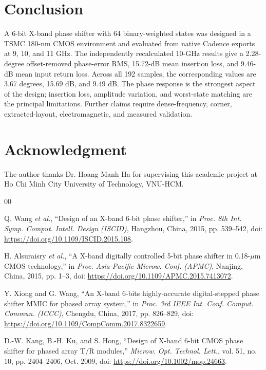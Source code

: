 \documentclass[conference]{IEEEtran}
\begin{document}
\section{Conclusion}

\balance

A 6-bit X-band phase shifter with 64 binary-weighted states was designed in a
TSMC 180-nm CMOS environment and evaluated from native Cadence exports at
9, 10, and 11 GHz. The independently recalculated 10-GHz results give a
2.28-degree offset-removed phase-error RMS, 15.72-dB mean insertion loss, and
9.46-dB mean input return loss.
Across all 192 samples, the corresponding
values are 3.67 degrees, 15.69 dB, and 9.49 dB. The phase response is the
strongest aspect of the design; insertion loss, amplitude variation, and
worst-state matching are the principal limitations. Further claims require
dense-frequency, corner, extracted-layout, electromagnetic, and measured
validation.

\section*{Acknowledgment}

The author thanks Dr. Hoang Manh Ha for supervising this academic project at
Ho Chi Minh City University of Technology, VNU-HCM.

\begin{thebibliography}{00}

Q. Wang \textit{et al.}, ``Design of an X-band 6-bit phase shifter,'' in
\textit{Proc. 8th Int. Symp. Comput. Intell. Design (ISCID)}, Hangzhou,
China, 2015, pp. 539--542, doi:
\url{https://doi.org/10.1109/ISCID.2015.108}.

H. Alsuraisry \textit{et al.}, ``A X-band digitally controlled 5-bit phase
shifter in 0.18-$\mu$m CMOS technology,'' in \textit{Proc. Asia-Pacific
Microw. Conf. (APMC)}, Nanjing, China, 2015, pp. 1--3,
doi: \url{https://doi.org/10.1109/APMC.2015.7413072}.

Y. Xiong and G. Wang, ``An X-band 6-bits highly-accurate digital-stepped
phase shifter MMIC for phased array system,'' in \textit{Proc. 3rd IEEE Int.
Conf. Comput. Commun. (ICCC)}, Chengdu, China, 2017, pp. 826--829,
doi: \url{https://doi.org/10.1109/CompComm.2017.8322659}.

D.-W. Kang, B.-H. Ku, and S. Hong, ``Design of X-band 6-bit CMOS phase
shifter for phased array T/R modules,'' \textit{Microw. Opt. Technol. Lett.},
vol. 51, no. 10, pp. 2404--2406, Oct. 2009,
doi: \url{https://doi.org/10.1002/mop.24663}.

\end{thebibliography}
\end{document}
